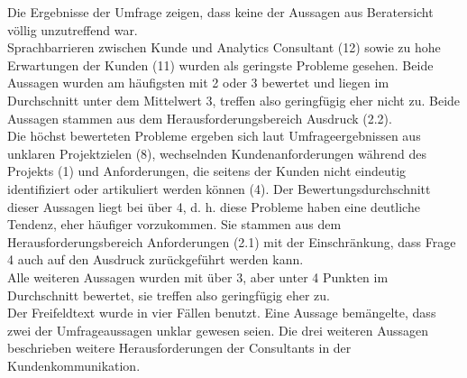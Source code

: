 \documentclass[../main.tex]{subfiles}
\begin{document}
Die Ergebnisse der Umfrage zeigen, dass keine der Aussagen aus Beratersicht völlig unzutreffend war.
\\
Sprachbarrieren zwischen Kunde und Analytics Consultant (12) sowie zu hohe Erwartungen der Kunden (11) wurden als geringste Probleme gesehen. 
Beide Aussagen wurden am häufigsten mit 2 oder 3 bewertet und liegen im Durchschnitt unter dem Mittelwert 3, treffen also geringfügig eher nicht zu. 
Beide Aussagen stammen aus dem Herausforderungsbereich Ausdruck (2.2).
\\
Die höchst bewerteten Probleme ergeben sich laut Umfrageergebnissen aus unklaren Projektzielen (8), wechselnden Kundenanforderungen während des Projekts (1) und Anforderungen, die seitens der Kunden nicht eindeutig identifiziert oder artikuliert werden können (4).
Der Bewertungsdurchschnitt dieser Aussagen liegt bei über 4, d. h. diese Probleme haben eine deutliche Tendenz, eher häufiger vorzukommen. 
Sie stammen aus dem Herausforderungsbereich Anforderungen (2.1) mit der Einschränkung, dass Frage 4 auch auf den Ausdruck zurückgeführt werden kann. 
\\
Alle weiteren Aussagen wurden mit über 3, aber unter 4 Punkten im Durchschnitt bewertet, sie treffen also geringfügig eher zu.
\\
Der Freifeldtext wurde in vier Fällen benutzt. Eine Aussage bemängelte, dass zwei der Umfrageaussagen unklar gewesen seien. 
Die drei weiteren Aussagen beschrieben weitere Herausforderungen der Consultants in der Kundenkommunikation. 
\end{document}
